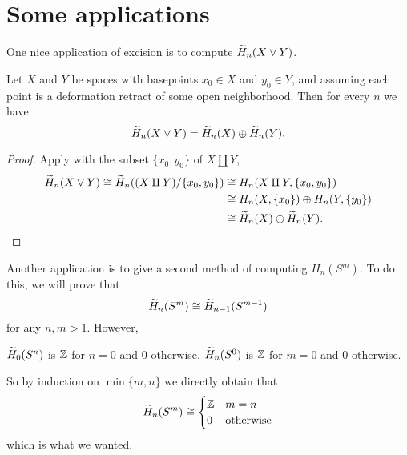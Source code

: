 \section{Some applications}
One nice application of excision is to compute $\widetilde H_n(X \vee Y)$.
\begin{theorem}
	Let $X$ and $Y$ be spaces with basepoints $x_0 \in X$ and $y_0 \in Y$,
	and assuming each point is a deformation retract of some open neighborhood.
	Then for every $n$ we have
	\[
		\widetilde H_n(X \vee Y)
		= \widetilde H_n(X) \oplus \widetilde H_n(Y).
	\]
\end{theorem}
\begin{proof}
	Apply  with the subset $\{x_0, y_0\}$ of $X \amalg Y$,
	\begin{align*}
		\widetilde H_n (X \vee Y)
		\cong \widetilde H_n( (X \amalg Y) / \{x_0, y_0\} )
		&\cong H_n(X \amalg Y, \{x_0,y_0\}) \\
		&\cong H_n(X, \{x_0\}) \oplus H_n(Y, \{y_0\}) \\
		&\cong\widetilde H_n(X) \oplus \widetilde H_n(Y). \qedhere
	\end{align*}
\end{proof}

Another application is to give a second method
of computing $H_n(S^m)$.
To do this, we will prove that
\[ \widetilde H_n(S^m) \cong \widetilde H_{n-1}(S^{m-1}) \]
for any $n,m > 1$.
However, 
\begin{itemize}
	\ii $\widetilde H_0(S^n)$ is $\mathbb Z$ for $n=0$ and $0$ otherwise.
	\ii $\widetilde H_n(S^0)$ is $\mathbb Z$ for $m=0$ and $0$ otherwise.
\end{itemize}
So by induction on $\min \{m,n\}$ we directly obtain that
\[
	\widetilde H_n(S^m) \cong
	\begin{cases}
		\mathbb Z & m=n \\
		0 & \text{otherwise}
	\end{cases}
\]
which is what we wanted.

